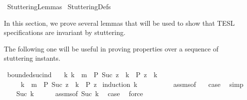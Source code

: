 %
\begin{isabellebody}%
%
%
\isadelimdocument
%
\endisadelimdocument
%
\isatagdocument
%
\isamarkuptrue%
%
\endisatagdocument
{\isafolddocument}%
%
\isadelimdocument
%
\endisadelimdocument
%
\isadelimtheory
%
\endisadelimtheory
%
\isatagtheory
{}\isamarkupfalse%
\ StutteringLemmas\isanewline
\isanewline
{}\ StutteringDefs\isanewline
\isanewline
{}%
\endisatagtheory
{\isafoldtheory}%
%
\isadelimtheory
%
\endisadelimtheory
%
\begin{isamarkuptext}%
In this section, we prove several lemmas that will be used to show that TESL 
  specifications are invariant by stuttering.

  The following one will be useful in proving properties over a sequence of 
  stuttering instants.%
\end{isamarkuptext}\isamarkuptrue%
\isamarkupfalse%
\ bounded{\isacharunderscore}suc{\isacharunderscore}ind{\isacharcolon}\isanewline
\ \ \ {\isacartoucheopen}{\isasymAnd}k{\isachardot}\ k\ {\isacharless}\ m\ {\isasymLongrightarrow}\ P\ {\isacharparenleft}Suc\ {\isacharparenleft}z\ {\isacharplus}\ k{\isacharparenright}{\isacharparenright}\ {\isacharequal}\ P\ {\isacharparenleft}z\ {\isacharplus}\ k{\isacharparenright}{\isacartoucheclose}\isanewline
\ \ \ \ \ {\isacartoucheopen}k\ {\isacharless}\ m\ {\isasymLongrightarrow}\ P\ {\isacharparenleft}Suc\ {\isacharparenleft}z\ {\isacharplus}\ k{\isacharparenright}{\isacharparenright}\ {\isacharequal}\ P\ z{\isacartoucheclose}\isanewline
%
\isadelimproof
%
\endisadelimproof
%
\isatagproof
{}\isamarkupfalse%
\ {\isacharparenleft}induction\ k{\isacharparenright}\isanewline
\ \ \isamarkupfalse%
\ {}\isanewline
\ \ \ \ \isamarkupfalse%
\ assms{\isacharparenleft}{}{\isacharparenright}{\isacharbrackleft}of\ {}{\isacharbrackright}\ \isamarkupfalse%
\ {\isacharquery}case\ \isamarkupfalse%
\ simp\isanewline
{}\isamarkupfalse%
\isanewline
\ \ \isamarkupfalse%
\ {\isacharparenleft}Suc\ k{\isacharprime}{\isacharparenright}\isanewline
\ \ \ \ \isamarkupfalse%
\ assms{\isacharbrackleft}of\ {\isacartoucheopen}Suc\ k{\isacharprime}{\isacartoucheclose}{\isacharbrackright}\ \isamarkupfalse%
\ {\isacharquery}case\ \isamarkupfalse%
\ force\isanewline

\end{isabellebody}
